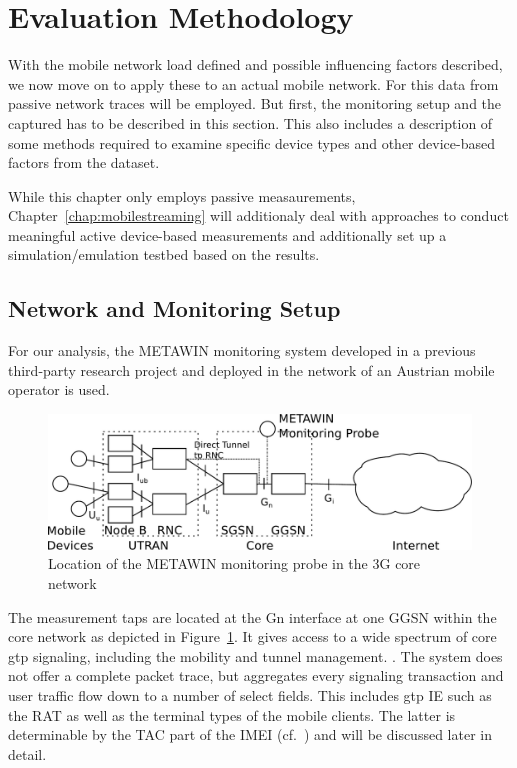 \section{Evaluation Methodology}
\label{c4:methodology}

With the mobile network load defined and possible influencing factors described, we now move on to apply these to an actual mobile network. For this data from passive network traces will be employed. But first, the monitoring setup and the captured has to be described in this section. This also includes a description of some methods required to examine specific device types and other device-based factors from the dataset.

While this chapter only employs passive measaurements, Chapter~\ref{chap:mobilestreaming} will additionaly deal with approaches to conduct meaningful active device-based measurements and additionally set up a simulation/emulation testbed based on the results.

\subsection{Network and Monitoring Setup}

For our analysis, the \gls{METAWIN} monitoring system developed in a previous third-party research project and deployed in the network of an Austrian mobile operator is used. \cite{ricciato_2011,ricciato2006traffic}

\begin{figure}[htb]
	\centering
	\includegraphics[width=1.0\textwidth]{images/umts-network.pdf}
	\caption{Location of the \acrshort{METAWIN} monitoring probe in the \gls{3G} core network}
	\label{c4:fig:umtsnetwork}
\end{figure}


The measurement taps are located at the Gn interface at one \gls{GGSN} within the core network as depicted in Figure~\ref{c4:fig:umtsnetwork}. It gives access to a wide spectrum of core \gls{gtp} signaling, including the mobility and tunnel management. \cite{3gpp.29.060}. The system does not offer a complete packet trace, but aggregates every signaling transaction and user traffic flow down to a number of select fields. This includes \gls{gtp} \gls{IE} such as the \gls{RAT}  as well as the terminal types of the mobile clients. The latter is determinable by the \gls{TAC} part of the \gls{IMEI} (cf.~\cite{3gpp.23.003}) and will be discussed later in detail.

